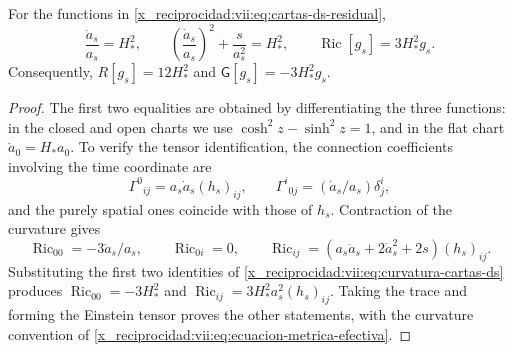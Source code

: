 \begin{lemma}
\label{x_reciprocidad:vii:lem:curvatura-cartas-ds}
For the functions in \eqref{x_reciprocidad:vii:eq:cartas-ds-residual},
\begin{equation}
 \frac{\ddot a_s}{a_s}=H_*^2,\qquad
 \left(\frac{\dot a_s}{a_s}\right)^2+\frac{s}{a_s^2}=H_*^2,
 \qquad
 \operatorname{Ric}[g_s]=3H_*^2g_s.
 \label{x_reciprocidad:vii:eq:curvatura-cartas-ds}
\end{equation}
Consequently, \(R[g_s]=12H_*^2\) and
\(\mathsf G[g_s]=-3H_*^2g_s\).
\end{lemma}
\begin{proof}
The first two equalities are obtained by differentiating the three functions:
in the closed and open charts we use
\(\cosh^2z-\sinh^2z=1\), and in the flat chart
\(\dot a_0=H_*a_0\). To verify the tensor identification,
the connection coefficients involving the time coordinate are
\[
 \Gamma^0{}_{ij}=a_s\dot a_s(h_s)_{ij},\qquad
 \Gamma^i{}_{0j}=(\dot a_s/a_s)\delta^i_j,
\]
and the purely spatial ones coincide with those of \(h_s\).
Contraction of the curvature gives
\[
 \operatorname{Ric}_{00}=-3\ddot a_s/a_s,\qquad
 \operatorname{Ric}_{0i}=0,\qquad
 \operatorname{Ric}_{ij}
  =(a_s\ddot a_s+2\dot a_s^2+2s)(h_s)_{ij}.
\]
Substituting the first two identities of
\eqref{x_reciprocidad:vii:eq:curvatura-cartas-ds} produces
\(\operatorname{Ric}_{00}=-3H_*^2\) and
\(\operatorname{Ric}_{ij}=3H_*^2a_s^2(h_s)_{ij}\).
Taking the trace and forming the Einstein tensor proves the other
statements, with the curvature convention of
\eqref{x_reciprocidad:vii:eq:ecuacion-metrica-efectiva}.
\end{proof}

